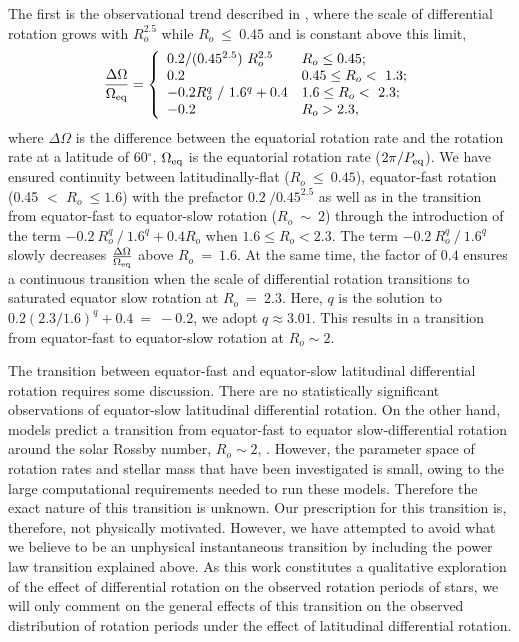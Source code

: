 The first is the observational trend described in \citet{saar_starspots_2011}, where the scale of differential rotation grows with $R_o^{2.5}$ while $R_o \ \leq \ 0.45$ and is constant above this limit,
\begin{equation}
\label{eq:rot_saar}
{\centering
\frac{\Delta\Omega}{\Omega_{\rm{eq}}} = \left\{
\begin{array}{ll}
 0.2/(0.45^{2.5}) \ R_o^{2.5}& R_o\leq 0.45; \\
 0.2 & 0.45 \leq R_o < \ 1.3;\\
 -0.2 R_o^q \ / \ 1.6^q + 0.4 & 1.6 \leq R_o < \ 2.3;\\
 -0.2 & R_o > 2.3,
\end{array} 
\right.}
\end{equation}
where $\Delta \Omega$ is the difference between the equatorial rotation rate and the rotation rate at a latitude of 60$^{\circ}$, $\Omega_{\rm{eq}}$ is the equatorial rotation rate ($2\pi/P_{\rm{eq}}$).
We have ensured continuity between latitudinally-flat ($R_o \ \leq \ 0.45$), equator-fast rotation (0.45 $<$ $R_o \ \leq 1.6$) with the prefactor $0.2 \ / 0.45^{2.5}$ as well as in the transition from equator-fast to equator-slow rotation ($R_o \ \sim \ 2$) through the introduction of the term $-0.2 \ R_o^q \ / \ 1.6^q + 0.4 R_o$ when $1.6 \leq R_o < 2.3$.
The term $-0.2 \ R_o^q \ / \ 1.6^q$ slowly decreases $\frac{\Delta \Omega}{\Omega_{\rm{eq}}}$ above $R_o \ = \ 1.6$. 
At the same time, the factor of $0.4$ ensures a continuous transition when the scale of differential rotation transitions to saturated equator slow rotation at $R_o \ = \ 2.3$.
Here, $q$ is the solution to $0.2 \left(2.3/1.6\right)^q + 0.4 \ = \ -0.2 $, we adopt $q \approx 3.01$.
This results in a transition from equator-fast to equator-slow rotation at $R_o \sim 2$.

The transition between equator-fast and equator-slow latitudinal differential rotation requires some discussion.
There are no statistically significant observations of equator-slow latitudinal differential rotation.
On the other hand, models predict a transition from equator-fast to equator slow-differential rotation around the solar Rossby number, $R_o \sim 2$, \citep{brun_powering_2022}.
However, the parameter space of rotation rates and stellar mass that have been investigated is small, owing to the large computational requirements needed to run these models.
Therefore the exact nature of this transition is unknown.
Our prescription for this transition is, therefore, not physically motivated.
However, we have attempted to avoid what we believe to be an unphysical instantaneous transition by including the power law transition explained above.
As this work constitutes a qualitative exploration of the effect of differential rotation on the observed rotation periods of stars, we will only comment on the general effects of this transition on the observed distribution of rotation periods under the effect of latitudinal differential rotation.

